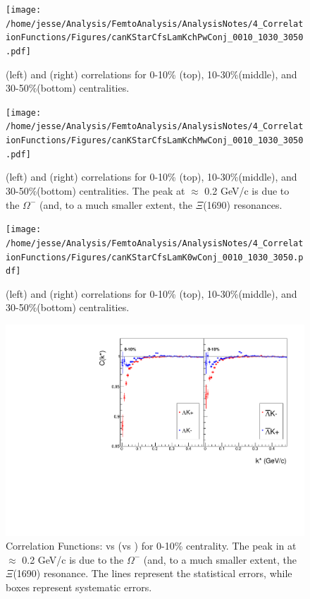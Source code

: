 \documentclass[/home/jesse/Analysis/FemtoAnalysis/AnalysisNotes/AnalysisNoteJBuxton.tex]{subfiles}
\begin{document}
\begin{figure}[h]
  \centering
  \texttt{[image: /home/jesse/Analysis/FemtoAnalysis/AnalysisNotes/4\_CorrelationFunctions/Figures/canKStarCfsLamKchPwConj\_0010\_1030\_3050.pdf]}
  \caption[\LamKchP \& \ALamKchM Correlation Functions]
  {
  \LamKchP (left) and \ALamKchM (right) correlations for 0-10\% (top), 10-30\%(middle), and 30-50\%(bottom) centralities.
  }
  \label{fig:AllCfs:a}
\end{figure}

\begin{figure}[h]
  \centering
  \texttt{[image: /home/jesse/Analysis/FemtoAnalysis/AnalysisNotes/4\_CorrelationFunctions/Figures/canKStarCfsLamKchMwConj\_0010\_1030\_3050.pdf]}
  \caption[\LamKchM \& \ALamKchP Correlation Functions]
  {
  \LamKchM (left) and \ALamKchP (right) correlations for 0-10\% (top), 10-30\%(middle), and 30-50\%(bottom) centralities.  
  The peak at \kstar $\approx$ 0.2 GeV/c is due to the $\Omega^{-}$ (and, to a much smaller extent, the $\Xi$(1690) resonances.
  }
  \label{fig:AllCfs:b}
\end{figure}

\begin{figure}[h]
  \centering
  \texttt{[image: /home/jesse/Analysis/FemtoAnalysis/AnalysisNotes/4\_CorrelationFunctions/Figures/canKStarCfsLamK0wConj\_0010\_1030\_3050.pdf]}
  \caption[\LamKs \& \ALamKs Correlation Functions]
  {
  \LamKs (left) and \ALamKs (right) correlations for 0-10\% (top), 10-30\%(middle), and 30-50\%(bottom) centralities.
  }
  \label{fig:AllCfs:c}
\end{figure}


\begin{figure}[h]
  \centering
  \includegraphics[width=\textwidth]{4_CorrelationFunctions/Figures/canLamKchPvsLamKchM0010.pdf}
  \caption[Correlation Functions: \LamKchP vs \LamKchM for 0-10\% Centrality]{Correlation Functions: \LamKchP vs \LamKchM (\ALamKchP vs \ALamKchM) for 0-10\% centrality.  The peak in \LamKchMALamKchP at \kstar $\approx$ 0.2 GeV/c is due to the $\Omega^{-}$ (and, to a much smaller extent, the $\Xi$(1690) resonance.  The lines represent the statistical errors, while boxes represent systematic errors.}
  \label{fig:cLamcKchCfs0010}
\end{figure}

\clearpage
\end{document}
